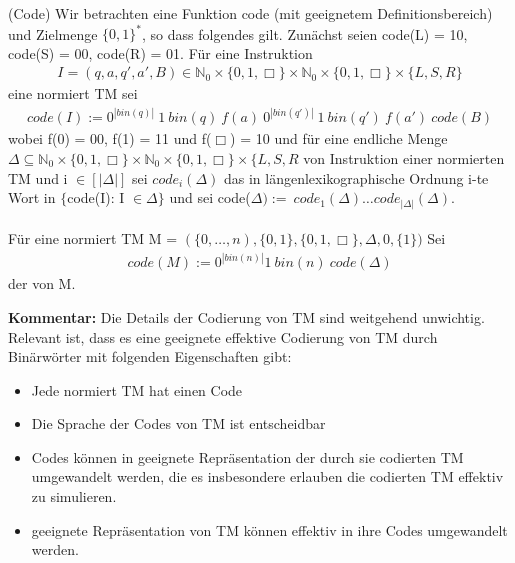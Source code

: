 \documentclass[a4paper]{article}
\begin{document}
\begin{DefBox}{(Code)}
Wir betrachten eine Funktion code (mit geeignetem Definitionsbereich) und Zielmenge $\lbrace 0,1 \rbrace^*$, so dass folgendes gilt. Zunächst seien code(L) = 10, code(S) = 00, code(R) = 01. Für eine Instruktion
\begin{align*}
 I = (q,a,q',a',B) \in \mathbb{N}_0 \times \lbrace 0,1,\Box \rbrace \times \mathbb{N}_0 \times \lbrace 0,1,\Box \rbrace \times \lbrace L,S,R \rbrace
\end{align*}
eine normiert TM sei
\begin{align*}
 code(I) := 0^{|bin(q)|} \ 1 \ bin(q) \ f(a) \ 0^{|bin(q')|} \ 1 \ bin(q') \ f(a') \ code(B)
\end{align*}
wobei f(0) = 00, f(1) = 11 und f($\Box$) = 10 und für eine endliche Menge $\Delta \subseteq \mathbb{N}_0 \times \lbrace 0,1,\Box \rbrace \times \mathbb{N}_0 \times \lbrace 0,1,\Box \rbrace \times \lbrace L,S,R$ von Instruktion einer normierten TM und i $\in [|\Delta|]$ sei $code_i(\Delta)$ das in längenlexikographische Ordnung i-te Wort in $\lbrace$code(I): I $\in \Delta \rbrace$ und sei code($\Delta) := \ code_1(\Delta) \dots code_{|\Delta|}(\Delta)$. \\
\\
Für eine normiert TM M = $(\lbrace 0,\dots,n), \lbrace 0,1 \rbrace, \lbrace 0,1,\Box \rbrace, \Delta, 0, \lbrace 1 \rbrace)$ Sei
\begin{align*}
 code(M) := 0^{|bin(n)|} 1 \ bin(n) \ code(\Delta)
\end{align*}
der  von M.
\end{DefBox}

\textbf{Kommentar:} Die Details der Codierung von TM sind weitgehend unwichtig. Relevant ist, dass es eine geeignete effektive Codierung von TM durch Binärwörter mit folgenden Eigenschaften gibt:
\begin{itemize}
 \item Jede normiert TM hat einen Code
 \item Die Sprache der Codes von TM ist entscheidbar
 \item Codes können in geeignete Repräsentation der durch sie codierten TM umgewandelt werden, die es insbesondere erlauben die codierten TM effektiv zu simulieren.
 \item geeignete Repräsentation von TM können effektiv in ihre Codes umgewandelt werden.
\end{itemize}
\end{document}
